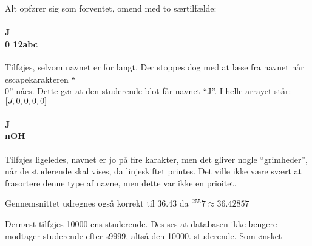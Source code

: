 Alt opfører sig som forventet, omend med to særtilfælde:
\paragraph{J\\0 12abc} Tilføjes, selvom navnet er for langt. Der stoppes dog med
at læse fra navnet når escapekarakteren ``\\0'' nåes. Dette gør at den
studerende blot får navnet ``J''. I helle arrayet står: $[J,\\0,\\0,\\0,\\0]$

\paragraph{J\\nOH} Tilføjes ligeledes, navnet er jo på fire karakter, men det
gliver nogle ``grimheder'', når de studerende skal vises, da linjeskiftet
printes. Det ville ikke være svært at frasortere denne type af navne, men dette
var ikke en prioitet.

Gennemsnittet udregnes også korrekt til 36.43 da $\frac{255}{}7 \approx
36.42857$

Dernæst tilføjes 10000 ens studerende. Des ses at databasen ikke længere
modtager studerende efter s9999, altså den 10000. studerende. Som ønsket

